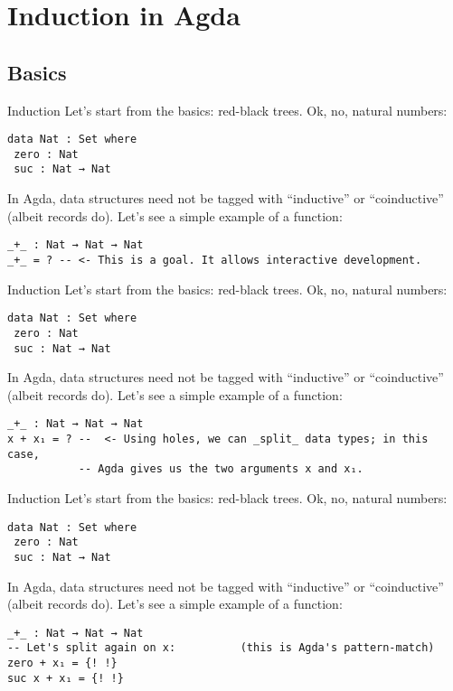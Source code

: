 \documentclass[t,aspectratio=169,9pt]{beamer}
\begin{document}
\section[induction]{Induction in Agda}
\subsection[induction]{Basics}
\begin{frame}[fragile]{Induction}
  Let's start from the basics: red-black trees. Ok, no, natural numbers:
\begin{verbatim}
data Nat : Set where
 zero : Nat
 suc : Nat → Nat
\end{verbatim}
  In Agda, data structures need not be tagged with ``inductive'' or
  ``coinductive'' (albeit records do).
  Let's see a simple example of a function:
\begin{verbatim}
_+_ : Nat → Nat → Nat
_+_ = ? -- <- This is a goal. It allows interactive development.
\end{verbatim}
\end{frame}
\begin{frame}{Induction}
  Let's start from the basics: red-black trees. Ok, no, natural numbers:
\begin{verbatim}
data Nat : Set where
 zero : Nat
 suc : Nat → Nat
\end{verbatim}
  In Agda, data structures need not be tagged with ``inductive'' or
  ``coinductive'' (albeit records do).
  Let's see a simple example of a function:
\begin{verbatim}
_+_ : Nat → Nat → Nat
x + x₁ = ? --  <- Using holes, we can _split_ data types; in this case,
           -- Agda gives us the two arguments x and x₁.
\end{verbatim}
\end{frame}
\begin{frame}{Induction}
  Let's start from the basics: red-black trees. Ok, no, natural numbers:
\begin{verbatim}
data Nat : Set where
 zero : Nat
 suc : Nat → Nat
\end{verbatim}
  In Agda, data structures need not be tagged with ``inductive'' or
  ``coinductive'' (albeit records do).
  Let's see a simple example of a function:
\begin{verbatim}
_+_ : Nat → Nat → Nat
-- Let's split again on x:          (this is Agda's pattern-match)
zero + x₁ = {! !}
suc x + x₁ = {! !}
\end{verbatim}
\end{frame}
\end{document}
